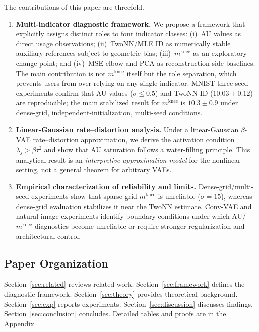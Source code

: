 \documentclass[make,article,submit,pdftex,moreauthors]{Definitions/mdpi}
\newcommand{\mknee}{m^{\mathrm{knee}}}
\begin{document}
The contributions of this paper are threefold.

\begin{enumerate}
\item \textbf{Multi-indicator diagnostic framework.}
We propose a framework that explicitly assigns distinct roles to four
indicator classes: (i)~AU values as direct usage observations; (ii)~TwoNN/MLE
ID as numerically stable auxiliary references subject to geometric bias;
(iii)~$\mknee$ as an exploratory change point; and (iv)~MSE elbow and PCA as
reconstruction-side baselines.
The main contribution is not $\mknee$ itself but the role separation, which
prevents users from over-relying on any single indicator.
MNIST three-seed experiments confirm that AU values ($\sigma\!\leq\!0.5$) and
TwoNN ID ($10.03\pm0.12$) are reproducible; the main stabilized result for
$\mknee$ is $10.3\pm0.9$ under dense-grid, independent-initialization,
multi-seed conditions.

\item \textbf{Linear-Gaussian rate--distortion analysis.}
Under a linear-Gaussian $\beta$-VAE rate--distortion approximation, we derive
the activation condition $\lambda_j>\beta\tau^2$ and show that AU saturation
follows a water-filling principle.
This analytical result is an \emph{interpretive approximation model} for the
nonlinear setting, not a general theorem for arbitrary VAEs.

\item \textbf{Empirical characterization of reliability and limits.}
Dense-grid/multi-seed experiments show that sparse-grid $\mknee$ is unreliable
($\sigma=15$), whereas dense-grid evaluation stabilizes it near the TwoNN
estimate.
Conv-VAE and natural-image experiments identify boundary conditions under which
AU/$\mknee$ diagnostics become unreliable or require stronger regularization and
architectural control.
\end{enumerate}

\subsection{Paper Organization}\label{sec:intro_org}

Section~\ref{sec:related} reviews related work.
Section~\ref{sec:framework} defines the diagnostic framework.
Section~\ref{sec:theory} provides theoretical background.
Section~\ref{sec:exp} reports experiments.
Section~\ref{sec:discussion} discusses findings.
Section~\ref{sec:conclusion} concludes.
Detailed tables and proofs are in the Appendix.
\end{document}
